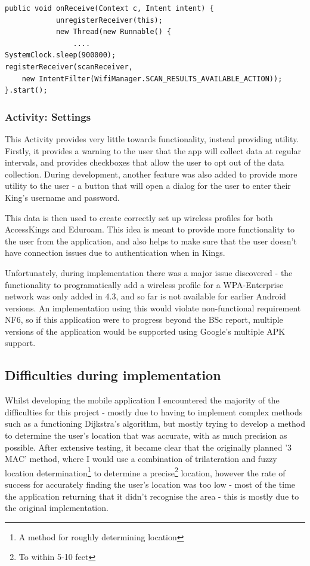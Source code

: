 \documentclass[11pt]{informatics-report}
\begin{document}
\begin{verbatim}
public void onReceive(Context c, Intent intent) {
            unregisterReceiver(this);
            new Thread(new Runnable() {
            	....
SystemClock.sleep(900000);
registerReceiver(scanReceiver, 
	new IntentFilter(WifiManager.SCAN_RESULTS_AVAILABLE_ACTION));
}.start();

\end{verbatim}

\subsubsection{Activity: Settings}

This Activity provides very little towards functionality, instead providing utility. Firstly, it provides a warning to the user that the app will collect data at regular intervals, and provides checkboxes that allow the user to opt out of the data collection. During development, another feature was also added to provide more utility to the user - a button that will open a dialog for the user to enter their King's username and password.

This data is then used to create correctly set up wireless profiles for both AccessKings and Eduroam. This idea is meant to provide more functionality to the user from the application, and also helps to make sure that the user doesn't have connection issues due to authentication when in Kings.

Unfortunately, during implementation there was a major issue discovered - the functionality to programatically add a wireless profile for a WPA-Enterprise network was only added in 4.3, and so far is not available for earlier Android versions. An implementation using this would violate non-functional requirement NF6, so if this application were to progress beyond the BSc report, multiple versions of the application would be supported using Google's multiple APK support.

\subsection{Difficulties during implementation}

Whilst developing the mobile application I encountered the majority of the difficulties for this project - mostly due to having to implement complex methods such as a functioning Dijkstra's algorithm, but mostly trying to develop a method to determine the user's location that was accurate, with as much precision as possible. After extensive testing, it became clear that the originally planned '3 MAC' method, where I would use a combination of trilateration and fuzzy location determination\footnote{A method for roughly determining location} to determine a precise\footnote{To within 5-10 feet} location, however the rate of success for accurately finding the user's location was too low - most of the time the application returning that it didn't recognise the area - this is mostly due to the original implementation.
\end{document}
